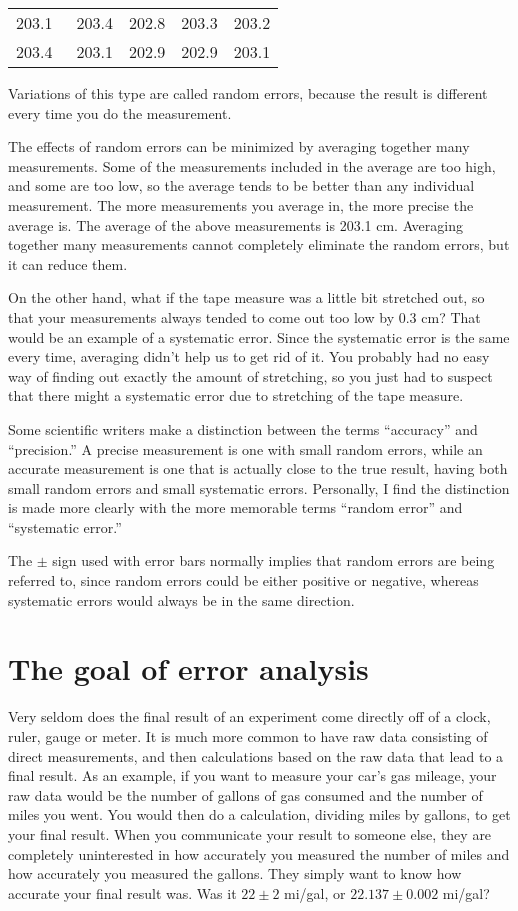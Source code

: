\begin{tabular}{lllll}
	203.1\ \zu{cm}	&203.4	&202.8	&203.3	&203.2\\
	203.4		&203.1	&202.9	&202.9	&203.1\\
\end{tabular}

Variations of this type are called random errors, because
the result is different every time you do the measurement.

The effects of random errors can be minimized by averaging
together many measurements. Some of the measurements
included in the average are too high, and some are too low,
so the average tends to be better than any individual
measurement. The more measurements you average in, the more
precise the average is. The average of the above measurements
is 203.1 cm. Averaging together many measurements cannot
completely eliminate the random errors, but it can reduce them.

On the other hand, what if the tape measure was a little bit
stretched out, so that your measurements always tended to
come out too low by 0.3 cm? That would be an example of a
systematic error. Since the systematic error is the same
every time, averaging didn't help us to get rid of it. You
probably had no easy way of finding out exactly the amount
of stretching, so you just had to suspect that there might a
systematic error due to stretching of the tape measure.


Some scientific writers make a distinction between the terms
``accuracy'' and ``precision.'' A precise measurement is one
with small random errors, while an accurate measurement is
one that is actually close to the true result, having both
small random errors and small systematic errors. Personally,
I find the distinction is made more clearly with the more
memorable terms ``random error'' and ``systematic error.''

The $\pm$ sign used with error bars normally implies that random
errors are being referred to, since random errors could be
either positive or negative, whereas systematic errors would
always be in the same direction.

\section*{The goal of error analysis}

	Very seldom does the final result of an experiment come
directly off of a clock, ruler, gauge or meter. It is much
more common to have raw data consisting of direct measurements,
and then calculations based on the raw data that lead to a
final result. As an example, if you want to measure your
car's gas mileage, your raw data would be the number of
gallons of gas consumed and the number of miles you went.
You would then do a calculation, dividing miles by gallons,
to get your final result. When you communicate your result
to someone else, they are completely uninterested in how
accurately you measured the number of miles and how
accurately you measured the gallons. They simply want to
know how accurate your final result was. Was it $22\pm2$ mi/gal,
or $22.137\pm0.002$ mi/gal?

